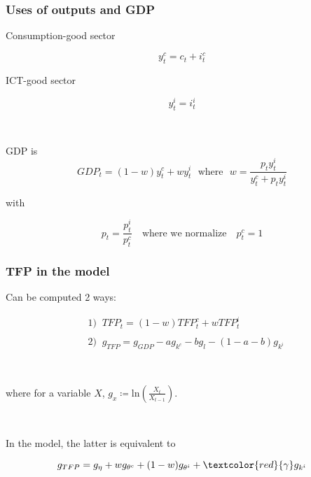 \documentclass{beamer}
\begin{document}
\begin{frame}
	\frametitle{Uses of outputs and GDP}

Consumption-good sector

$$
y^c_t = c_t + i^c_t
$$

ICT-good sector


$$
y^i_t = i^i_t
$$

\

GDP is 
$$
GDP_t = (1 - w) y^c_t+ w y^i_t \ \ \ \text{where} \ \ \ w = \frac{p_t y^i_t }{y^c_t + p_t y^i_t }
$$


with

$$
p_t = \frac{p_t^i}{p_t^c} \quad \text{where we normalize} \quad p_t^c = 1
$$



\end{frame}

\begin{frame}
	\frametitle{TFP in the model}

Can be computed 2 ways:

\begin{align*}
&1) \;\; TFP_t = (1 - w) TFP_t^c + w TFP_t^i \\
\\
& 2) \;\; g_{TFP} = g_{GDP} - a g_{k^c} -b g_{l} - (1-a-b)g_{k^i}
\end{align*}

\

where for a variable $X$, $g_x \coloneqq \text{ln}\left(\frac{X_t}{X_{t-1}}\right)$.

\

In the model, the latter is equivalent to

\begin{equation}
g_{TFP} = g_{\eta} + wg_{\theta^c} + (1-w)g_{\theta^i} +\textcolor{red}{\gamma}  g_{k^i}
\end{equation}



\end{frame}
\end{document}
